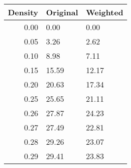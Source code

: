 \begin{tabular}{rll}
\toprule
Density &  Original &  Weighted \\
\midrule
0.00    &        0.00 &          0.00 \\
0.05    &        3.26 &          2.62 \\
0.10    &        8.98 &          7.11 \\
0.15    &       15.59 &         12.17 \\
0.20    &       20.63 &         17.34 \\
0.25    &       25.65 &         21.11 \\
0.26    &       27.87 &         24.23 \\
0.27    &       27.49 &         22.81 \\
0.28    &       29.26 &         23.07 \\
0.29    &       29.41 &         23.83 \\
\bottomrule
\end{tabular}
